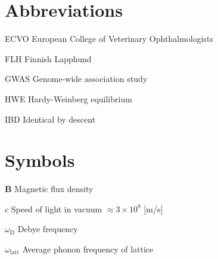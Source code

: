 \documentclass[12pt, a4paper, oneside]{article}
\begin{document}
\clearpage


\onehalfspacing

{}

\section*{Abbreviations} \label{sec:abbreviations}


\begin{abbreviations}
    \item [ECVO]         European College of Veterinary Ophthalmologists
    \item [FLH]          Finnish Lapphund
    \item [GWAS]         Genome-wide association study
    \item [HWE]          Hardy-Weinberg equilibrium
    \item [IBD]          Identical by descent
\end{abbreviations}

\section*{Symbols}

\begin{abbreviations}
    \item [$\mathbf{B}$]                Magnetic flux density
    \item [$c$]                         Speed of light in vacuum $\approx 3\times10^8$ [m/s]
    \item [$\omega_{\mathrm{D}}$]       Debye frequency
    \item [$\omega_{\mathrm{latt}}$]    Average phonon frequency of lattice
\end{abbreviations}
\end{document}
